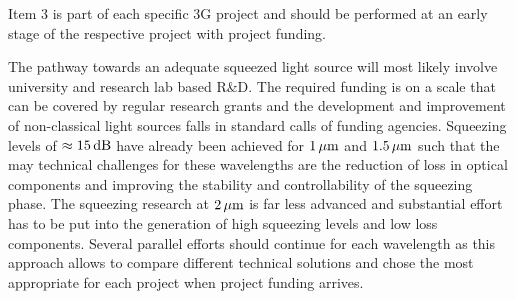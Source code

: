 Item 3 is part of each specific 3G project and should be performed at an early stage of the respective project with project funding.

The pathway towards an adequate squeezed light source will most likely involve university and research lab based R\&D. The required funding is on a scale that can be covered by regular research grants and the development and improvement of non-classical light sources falls in standard calls of funding agencies. Squeezing levels of $ \approx 15 \, {\rm dB} $ have already been achieved for  $ 1\, {\rm \mu m}$ and  $ 1.5\, {\rm \mu m}$ such that the may technical challenges for these wavelengths are the reduction of loss in optical components and  improving the stability and controllability of the squeezing phase. The squeezing research at $ 2\, {\rm \mu m}$ is far less advanced and substantial effort has to be put into the generation of high squeezing levels and low loss components. Several parallel efforts should continue for each wavelength as this approach allows to compare different technical solutions and chose the most appropriate for each project when project funding arrives.


